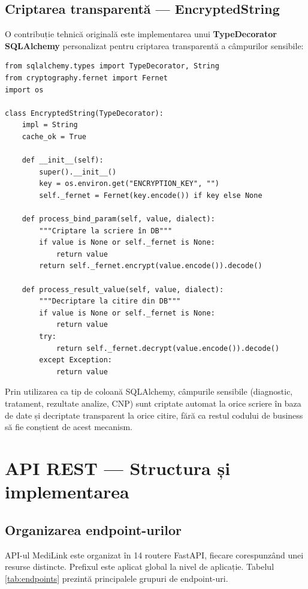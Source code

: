 \subsection{Criptarea transparentă — EncryptedString}

O contribuție tehnică originală este implementarea unui \textbf{TypeDecorator SQLAlchemy} personalizat pentru criptarea transparentă a câmpurilor sensibile:

\begin{lstlisting}[language=Python3, caption={TypeDecorator pentru criptare transparentă}]
from sqlalchemy.types import TypeDecorator, String
from cryptography.fernet import Fernet
import os

class EncryptedString(TypeDecorator):
    impl = String
    cache_ok = True

    def __init__(self):
        super().__init__()
        key = os.environ.get("ENCRYPTION_KEY", "")
        self._fernet = Fernet(key.encode()) if key else None

    def process_bind_param(self, value, dialect):
        """Criptare la scriere în DB"""
        if value is None or self._fernet is None:
            return value
        return self._fernet.encrypt(value.encode()).decode()

    def process_result_value(self, value, dialect):
        """Decriptare la citire din DB"""
        if value is None or self._fernet is None:
            return value
        try:
            return self._fernet.decrypt(value.encode()).decode()
        except Exception:
            return value
\end{lstlisting}

Prin utilizarea  ca tip de coloană SQLAlchemy, câmpurile sensibile (diagnostic, tratament, rezultate analize, CNP) sunt criptate automat la orice scriere în baza de date și decriptate transparent la orice citire, fără ca restul codului de business să fie conștient de acest mecanism.

\section{API REST — Structura și implementarea}

\subsection{Organizarea endpoint-urilor}

API-ul MediLink este organizat în 14 routere FastAPI, fiecare corespunzând unei resurse distincte. Prefixul  este aplicat global la nivel de aplicație. Tabelul \ref{tab:endpoints} prezintă principalele grupuri de endpoint-uri.

